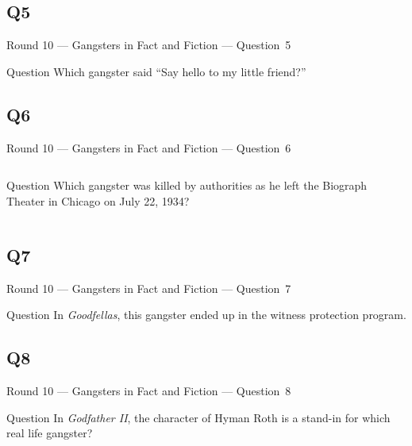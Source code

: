 \documentclass[11pt]{beamer}
\begin{document}
\subsection*{Q5}
\begin{frame}[t]{Round 10 --- Gangsters in Fact and Fiction --- \mbox{Question 5}}
\begin{block}{Question}
Which gangster said ``Say hello to my little friend?''
\end{block}
\end{frame}
\subsection*{Q6}
\begin{frame}[t]{Round 10 --- Gangsters in Fact and Fiction --- \mbox{Question 6}}
\begin{columns}[T,totalwidth=\linewidth]
\begin{column}{0.32\linewidth}
\begin{block}{Question}
Which gangster was killed by authorities as he left the Biograph Theater in Chicago on July 22, 1934?
\end{block}
\end{column}
\begin{column}{0.65\linewidth}
\begin{center}
\texttt{[image: \{Images/biograph]}.jpg}
\end{center}
\end{column}
\end{columns}
\end{frame}
\subsection*{Q7}
\begin{frame}[t]{Round 10 --- Gangsters in Fact and Fiction --- \mbox{Question 7}}
\begin{block}{Question}
In \emph{Goodfellas}, this gangster ended up in the witness protection program.
\end{block}
\end{frame}
\subsection*{Q8}
\begin{frame}[t]{Round 10 --- Gangsters in Fact and Fiction --- \mbox{Question 8}}
\begin{block}{Question}
In \emph{Godfather II}, the character of Hyman Roth is a stand-in for which real life gangster? 
\end{block}
\end{frame}
\end{document}
